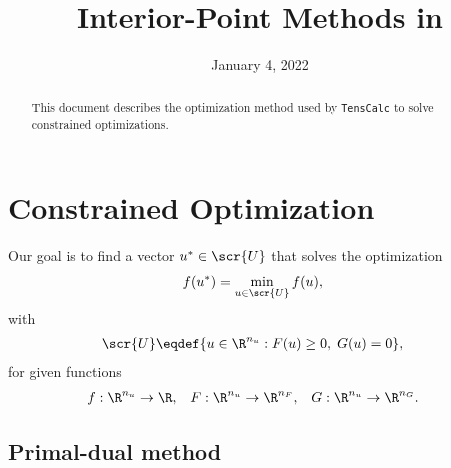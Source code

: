 \documentclass[11pt]{article}
\title{Interior-Point Methods in \TC}
\author{\jph}
\date{January 4, 2022}
\newcommand{\TC}{\texttt{TensCalc}}
\begin{document}
                        \maketitle

\begin{abstract}
  This document describes the optimization method used by \TC{} to
  solve constrained optimizations.
\end{abstract}

\section{Constrained Optimization}
\label{sec:ipm-o}

Our goal is to find a vector $u^*\in\scr{U}$ that solves the
optimization
\begin{align}\label{eq:minimization}
  f(u^*)&=\min_{u\in\scr{U}} f(u), &
\end{align}
with
\begin{align*}
  \scr{U}&\eqdef\{u\in\R^{n_u}: F(u)\ge 0,\; G(u)=0\}, 
\end{align*}
for given functions
\begin{align*}
  &f:\R^{n_u}\to\R, &
  &F:\R^{n_u}\to\R^{n_F}, &
  &G:\R^{n_u}\to\R^{n_G}.
\end{align*}

\subsection{Primal-dual method}
\end{document}
